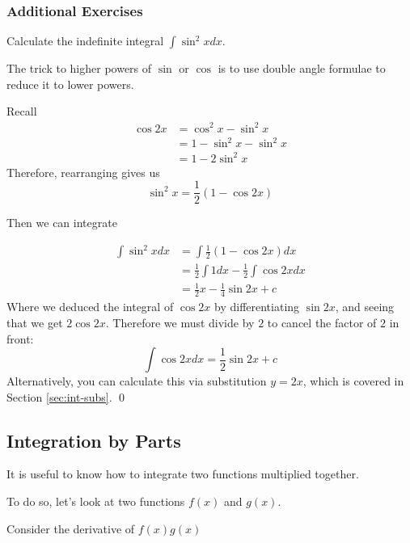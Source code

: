 \subsubsection{Additional Exercises}
\begin{example}
    Calculate the indefinite integral $\int \sin^2 x dx$.
\end{example}
\begin{solution}
    The trick to higher powers of $\sin$ or $\cos$ is to use double angle formulae to reduce it to lower powers.

    Recall 
    \begin{align*}
        \cos 2x &= \cos^2 x - \sin^2 x \tag{double angle formula for $\cos$} \\
         &= 1 - \sin^2 x - \sin^2 x \tag{using $\sin^2 x + \cos^2 x = 1$} \\
          &= 1 - 2\sin^2 x \tag{collecting terms}
    \end{align*}
    Therefore, rearranging gives us 
    \[ \sin^2 x = \frac{1}{2}(1 - \cos 2x)\]

    Then we can integrate 

    \begin{align*} 
        \int \sin^2 x dx &= \int  \frac{1}{2}(1 - \cos 2x) dx \tag{substituting the power reduction formula} \\
         &= \frac{1}{2} \int 1dx - \frac{1}{2}  \int \cos 2x dx \tag{expanding and factorising} \\
         &= \frac{1}{2} x - \frac{1}{4}  \sin 2x + c \tag{integrating}
    \end{align*}
    Where we deduced the integral of $\cos 2x$ by differentiating $\sin 2x$, and seeing that we get $2 \cos 2x$. Therefore we must divide by $2$ to cancel the factor of $2$ in front:
    \[ \int \cos 2x dx = \frac{1}{2} \sin 2x + c\]
    Alternatively, you can calculate this via substitution $y = 2x$, which is covered in Section \ref{sec:int-subs}.
    \qed
\end{solution}


\subsection{Integration by Parts} \label{sec:int-parts}
It is useful to know how to integrate two functions multiplied together.

To do so, let's look at two functions $f(x)$ and $g(x)$.

Consider the derivative of $f(x)g(x)$

